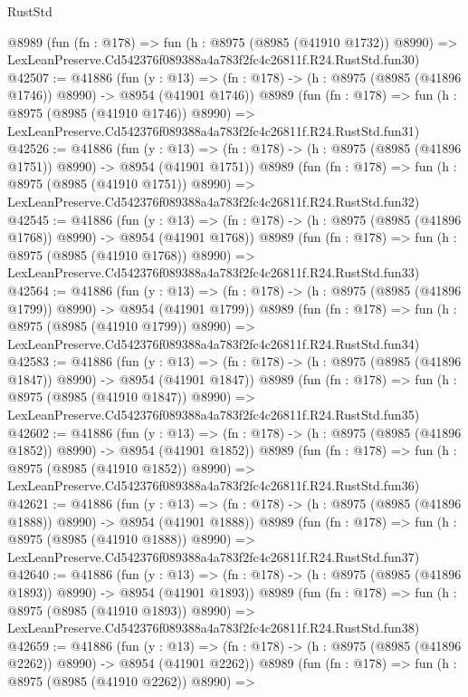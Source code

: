 \begin{lexlean}{RustStd}
\begin{coremodule}
    @8989
    (fun (fn : @178) =>
    fun (h : @8975 (@8985 (@41910 @1732)) @8990) =>
    LexLeanPreserve.Cd542376f089388a4a783f2fc4c26811f.R24.RustStd.fun30)
@42507 := @41886
    (fun (y : @13) =>
    (fn : @178) -> (h : @8975 (@8985 (@41896 @1746)) @8990) -> @8954 (@41901 @1746))
    @8989
    (fun (fn : @178) =>
    fun (h : @8975 (@8985 (@41910 @1746)) @8990) =>
    LexLeanPreserve.Cd542376f089388a4a783f2fc4c26811f.R24.RustStd.fun31)
@42526 := @41886
    (fun (y : @13) =>
    (fn : @178) -> (h : @8975 (@8985 (@41896 @1751)) @8990) -> @8954 (@41901 @1751))
    @8989
    (fun (fn : @178) =>
    fun (h : @8975 (@8985 (@41910 @1751)) @8990) =>
    LexLeanPreserve.Cd542376f089388a4a783f2fc4c26811f.R24.RustStd.fun32)
@42545 := @41886
    (fun (y : @13) =>
    (fn : @178) -> (h : @8975 (@8985 (@41896 @1768)) @8990) -> @8954 (@41901 @1768))
    @8989
    (fun (fn : @178) =>
    fun (h : @8975 (@8985 (@41910 @1768)) @8990) =>
    LexLeanPreserve.Cd542376f089388a4a783f2fc4c26811f.R24.RustStd.fun33)
@42564 := @41886
    (fun (y : @13) =>
    (fn : @178) -> (h : @8975 (@8985 (@41896 @1799)) @8990) -> @8954 (@41901 @1799))
    @8989
    (fun (fn : @178) =>
    fun (h : @8975 (@8985 (@41910 @1799)) @8990) =>
    LexLeanPreserve.Cd542376f089388a4a783f2fc4c26811f.R24.RustStd.fun34)
@42583 := @41886
    (fun (y : @13) =>
    (fn : @178) -> (h : @8975 (@8985 (@41896 @1847)) @8990) -> @8954 (@41901 @1847))
    @8989
    (fun (fn : @178) =>
    fun (h : @8975 (@8985 (@41910 @1847)) @8990) =>
    LexLeanPreserve.Cd542376f089388a4a783f2fc4c26811f.R24.RustStd.fun35)
@42602 := @41886
    (fun (y : @13) =>
    (fn : @178) -> (h : @8975 (@8985 (@41896 @1852)) @8990) -> @8954 (@41901 @1852))
    @8989
    (fun (fn : @178) =>
    fun (h : @8975 (@8985 (@41910 @1852)) @8990) =>
    LexLeanPreserve.Cd542376f089388a4a783f2fc4c26811f.R24.RustStd.fun36)
@42621 := @41886
    (fun (y : @13) =>
    (fn : @178) -> (h : @8975 (@8985 (@41896 @1888)) @8990) -> @8954 (@41901 @1888))
    @8989
    (fun (fn : @178) =>
    fun (h : @8975 (@8985 (@41910 @1888)) @8990) =>
    LexLeanPreserve.Cd542376f089388a4a783f2fc4c26811f.R24.RustStd.fun37)
@42640 := @41886
    (fun (y : @13) =>
    (fn : @178) -> (h : @8975 (@8985 (@41896 @1893)) @8990) -> @8954 (@41901 @1893))
    @8989
    (fun (fn : @178) =>
    fun (h : @8975 (@8985 (@41910 @1893)) @8990) =>
    LexLeanPreserve.Cd542376f089388a4a783f2fc4c26811f.R24.RustStd.fun38)
@42659 := @41886
    (fun (y : @13) =>
    (fn : @178) -> (h : @8975 (@8985 (@41896 @2262)) @8990) -> @8954 (@41901 @2262))
    @8989
    (fun (fn : @178) =>
    fun (h : @8975 (@8985 (@41910 @2262)) @8990) =>

\end{coremodule}
\end{lexlean}
